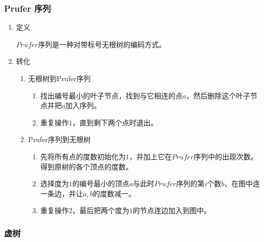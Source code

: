 \documentclass[11pt]{article}
\begin{document}
\subsubsection{Prufer 序列}
\label{sec-2-2-3}

\begin{enumerate}
\item 定义
\label{sec-2-2-3-1}

\(Prufer\)序列是一种对带标号无根树的编码方式。

\item 转化
\label{sec-2-2-3-2}

\begin{enumerate}
\item 无根树到Prufer序列
\label{sec-2-2-3-2-1}

\begin{enumerate}
\item 找出编号最小的叶子节点，找到与它相连的点\(a\)，然后删除这个叶子节点并把\(a\)加入序列。
\item 重复操作\(1\)，直到剩下两个点时退出。
\end{enumerate}

\item Prufer序列到无根树
\label{sec-2-2-3-2-2}

\begin{enumerate}
\item 先将所有点的度数初始化为\(1\)，并加上它在\(Prufer\)序列中的出现次数。得到原树的各个顶点的度数。
\item 选择度为\(1\)的编号最小的顶点\(a\)与此时\(Prufer\)序列的第\(i\)个数\(b\)，在图中连一条边\(<a,b>\)，并让\(a,b\)的度数减一。
\item 重复操作\(2\)，最后把两个度为\(1\)的节点连边加入到图中。
\end{enumerate}
\end{enumerate}
\end{enumerate}

\subsubsection{虚树}
\label{sec-2-2-4}
\end{document}
